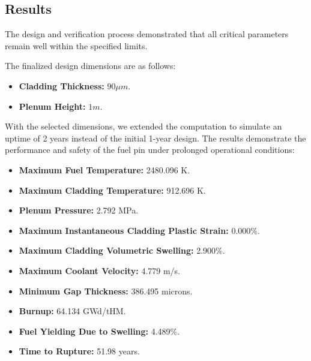 \subsection{Results}

The design and verification process demonstrated that all critical parameters remain well within the specified limits.

The finalized design dimensions are as follows:
\begin{itemize}
    \item \textbf{Cladding Thickness:} $90 \mu m$.
    \item \textbf{Plenum Height:} $1 m$.
\end{itemize}

With the selected dimensions, we extended the computation to simulate an uptime of 2 years instead of the initial 1-year design. The results demonstrate the performance and safety of the fuel pin under prolonged operational conditions:

\begin{itemize}
    \item \textbf{Maximum Fuel Temperature:} 2480.096 K.
    \item \textbf{Maximum Cladding Temperature:} 912.696 K.
    \item \textbf{Plenum Pressure:} 2.792 MPa.
    \item \textbf{Maximum Instantaneous Cladding Plastic Strain:} 0.000\%.
    \item \textbf{Maximum Cladding Volumetric Swelling:} 2.900\%.
    \item \textbf{Maximum Coolant Velocity:} 4.779 m/s.
    \item \textbf{Minimum Gap Thickness:} 386.495 microns.
    \item \textbf{Burnup:} 64.134 GWd/tHM.
    \item \textbf{Fuel Yielding Due to Swelling:} 4.489\%.
    \item \textbf{Time to Rupture:} 51.98 years.
\end{itemize}